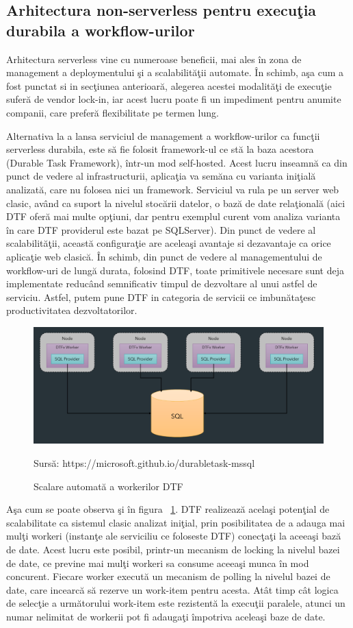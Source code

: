 \documentclass[a4paper,12pt]{report}
\newcommand{\source}[1]{\caption*{Sursă: {#1}} }
\begin{document}
\subsection{Arhitectura non-serverless pentru execuţia durabila a workflow-urilor}
\quad Arhitectura serverless vine cu numeroase beneficii, mai ales în zona de management a deploymentului şi a scalabilităţii automate. În schimb, aşa cum a fost punctat si in secţiunea anterioară, alegerea acestei modalităţi de execuţie suferă de vendor lock-in, iar acest lucru poate fi un impediment pentru anumite companii, care preferă flexibilitate pe termen lung. 
\par Alternativa la a lansa serviciul de management a workflow-urilor ca funcţii serverless durabila, este să fie folosit framework-ul ce stă la baza acestora (Durable Task Framework), într-un mod self-hosted. Acest lucru inseamnă ca din punct de vedere al infrastructurii, aplicaţia va semăna cu varianta iniţială analizată, care nu folosea nici un framework. Serviciul va rula pe un server web clasic, având ca suport la nivelul stocării datelor, o bază de date relaţională (aici DTF oferă mai multe opţiuni, dar pentru exemplul curent vom analiza varianta în care DTF providerul este bazat pe SQLServer).
Din punct de vedere al scalabilităţii, această configuraţie are aceleaşi avantaje si dezavantaje ca orice aplicaţie web clasică. În schimb, din punct de vedere al managementului de workflow-uri de lungă durata, folosind DTF, toate primitivele necesare sunt deja implementate reducând semnificativ timpul de dezvoltare al unui astfel de serviciu. Astfel, putem pune DTF in categoria de servicii ce imbunătaţesc productivitatea dezvoltatorilor.
 \begin{figure}[h]
\centering
        \includegraphics[width=1\textwidth]{images/dtf_scaling}
			 \caption{Scalare automată a workerilor DTF}
			 \label{fig:dtf-scaling}
			 \source {https://microsoft.github.io/durabletask-mssql}
\end{figure}
\par Aşa cum se poate observa şi în figura ~\ref{fig:dtf-scaling}. DTF realizează acelaşi potenţial de scalabilitate ca sistemul clasic analizat iniţial, prin posibilitatea de a adauga mai mulţi workeri (instanţe ale serviciliu ce foloseste DTF) conecţaţi la aceeaşi bază de date. Acest lucru este posibil, printr-un mecanism de locking la nivelul bazei de date, ce previne mai mulţi workeri sa consume aceeaşi munca în mod concurent. Fiecare worker execută un mecanism de polling la nivelul bazei de date, care incearcă să rezerve un work-item pentru acesta. Atât timp cât logica de selecţie a următorului work-item este rezistentă la execuţii paralele, atunci un numar nelimitat de workerii pot fi adaugaţi împotriva aceleaşi baze de date. 
\end{document}
